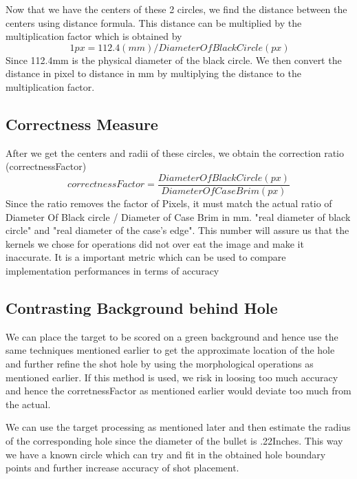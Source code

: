 \documentclass[10pt,twocolumn,letterpaper]{article}
\begin{document}
Now that we have the centers of these 2 circles, we find the distance between the centers using distance formula.
This distance can be multiplied by the multiplication factor which is obtained by
\[\ 1px = 112.4(mm)/DiameterOfBlackCircle(px) \] Since 112.4mm is the physical diameter of the black circle. We then convert the distance in pixel to distance in mm by multiplying the distance to the multiplication factor.
\subsection{Correctness Measure}
After we get the centers and radii of these circles, we obtain the correction ratio (correctnessFactor)
\[
correctnessFactor = \frac{Diameter Of Black Circle (px)}{Diameter Of Case Brim (px)}
\]
Since the ratio removes the factor of Pixels, it must match the actual ratio of Diameter Of Black circle / Diameter of Case Brim in mm.
"real diameter of black circle" and "real diameter of the case's edge". This number will assure us that the kernels we chose for operations did not over eat the image and make it inaccurate. It is a important metric which can be used to compare implementation performances in terms of accuracy 
\subsection{Contrasting Background behind Hole}

We can place the target to be scored on a green background and hence use the same techniques mentioned earlier to get the approximate location of the hole and further refine the shot hole by using the morphological operations as mentioned earlier.
If this method is used, we risk in loosing too much accuracy and hence the corretnessFactor as mentioned earlier would deviate too much from the actual.

We can use the target processing as mentioned later and then estimate the radius of the corresponding hole since the diameter of the bullet is .22Inches. This way we have a known circle which can try and fit in the obtained hole boundary points and further increase accuracy of shot placement.
\end{document}

